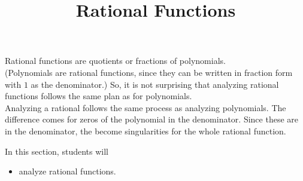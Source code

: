 \documentclass{ximera}
\title{Rational Functions}
\begin{document}
\begin{abstract}
\end{abstract}
\maketitle












Rational functions are quotients or fractions of polynomials.  \\


(Polynomials are rational functions, since they can be written in fraction form with $1$ as the denominator.)  So, it is not surprising that analyzing rational functions follows the same plan as for polynomials. \\


Analyzing a rational follows the same process as analyzing polynomials.  The difference comes for zeros of the polynomial in the denominator.  Since these are in the denominator, the become singularities for the whole rational function.


























\begin{sectionOutcomes}
In this section, students will 

\begin{itemize}
\item analyze rational functions.
\end{itemize}
\end{sectionOutcomes}
\end{document}
